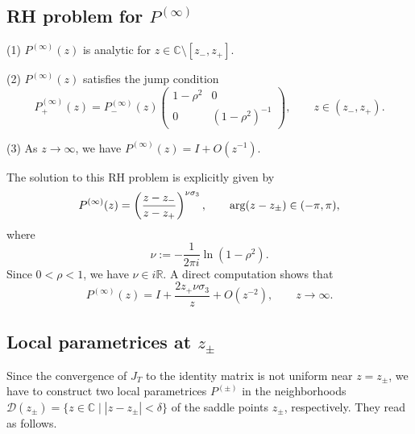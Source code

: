 \documentclass[11pt,a4paper]{article}
\numberwithin{equation}{section}
\def\arg {\mathop{\rm arg}\nolimits}
\begin{document}
\subsection*{RH problem for $P^{(\infty)}$}
\begin{description}
  \item{(1)} $P^{(\infty)}(z)$ is analytic for $z\in \mathbb{C}\setminus [z_{-},z_{+}]$.
  \item{(2)} $P^{(\infty)}(z)$ satisfies the jump condition
  \begin{equation}\label{Pinftyjump}
  {P}^{(\infty)}_{+}(z)={P}^{(\infty)}_{-}(z)
  \begin{pmatrix}1-\rho^2 & 0 \\ 0 & (1-\rho^2)^{-1}\end{pmatrix},\qquad z\in (z_-,z_+).
  \end{equation}
  \item{(3)} As $z\rightarrow \infty$, we have ${P}^{(\infty)}(z)=I+O(z^{-1})$.
\end{description}

The solution to this RH problem is explicitly given by
\begin{equation}\label{Pinfty}
{P}^{(\infty)}(z)=
\left(\frac{z-z_-}{z-z_+}\right)^{\nu\sigma_3},\qquad  \arg(z-z_\pm)\in(-\pi,\pi),
\end{equation}
where
\begin{equation}\label{nu}
\nu:=-\frac{1}{2\pi{i}}\ln(1-\rho^2).
\end{equation}
Since $0<\rho<1$, we have $\nu\in{i\mathbb{R}}$. A direct computation shows that
\begin{equation}\label{Pinfty-expansion}
P^{(\infty)}(z)=I+\frac{2z_+\nu\sigma_3}{z}+O(z^{-2}),\qquad z\to\infty.
\end{equation}




\subsection{Local parametrices at $z_{\pm}$}\label{subsec:localpara}
Since the convergence of $J_T$ to the identity matrix is not uniform near $z=z_\pm$, we have to construct two local parametrices ${P}^{(\pm)}$ in the neighborhoods $\mathcal{D}(z_{\pm})=\{z\in\mathbb{C}\mid|z-z_{\pm}|<\delta\}$ of the saddle points $z_{\pm}$, respectively. They
read as follows.
\end{document}

